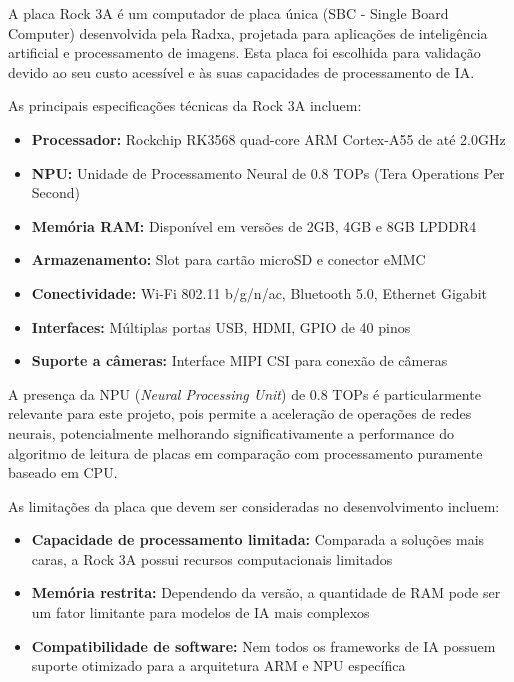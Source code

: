 A placa Rock 3A é um computador de placa única (SBC - Single Board Computer) desenvolvida pela Radxa, projetada para aplicações de inteligência artificial e processamento de imagens. Esta placa foi escolhida para validação devido ao seu custo acessível e às suas capacidades de processamento de IA.

As principais especificações técnicas da Rock 3A incluem:

\begin{itemize}
    \item \textbf{Processador:} Rockchip RK3568 quad-core ARM Cortex-A55 de até 2.0GHz
    \item \textbf{NPU:} Unidade de Processamento Neural de 0.8 TOPs (Tera Operations Per Second)
    \item \textbf{Memória RAM:} Disponível em versões de 2GB, 4GB e 8GB LPDDR4
    \item \textbf{Armazenamento:} Slot para cartão microSD e conector eMMC
    \item \textbf{Conectividade:} Wi-Fi 802.11 b/g/n/ac, Bluetooth 5.0, Ethernet Gigabit
    \item \textbf{Interfaces:} Múltiplas portas USB, HDMI, GPIO de 40 pinos
    \item \textbf{Suporte a câmeras:} Interface MIPI CSI para conexão de câmeras
\end{itemize}

A presença da NPU (\textit{Neural Processing Unit}) de 0.8 TOPs é particularmente relevante para este projeto, pois permite a aceleração de operações de redes neurais, potencialmente melhorando significativamente a performance do algoritmo de leitura de placas em comparação com processamento puramente baseado em CPU.

As limitações da placa que devem ser consideradas no desenvolvimento incluem:

\begin{itemize}
    \item \textbf{Capacidade de processamento limitada:} Comparada a soluções mais caras, a Rock 3A possui recursos computacionais limitados
    \item \textbf{Memória restrita:} Dependendo da versão, a quantidade de RAM pode ser um fator limitante para modelos de IA mais complexos
    \item \textbf{Compatibilidade de software:} Nem todos os frameworks de IA possuem suporte otimizado para a arquitetura ARM e NPU específica
\end{itemize}

